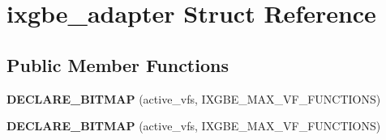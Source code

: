 \hypertarget{structixgbe__adapter}{
\section{ixgbe\_\-adapter Struct Reference}
\label{structixgbe__adapter}
}
\subsection*{Public Member Functions}
\begin{DoxyCompactItemize}
\item 
\hypertarget{structixgbe__adapter_aac0dfd863032737e6ca63d8edbc91b0a}{
{\bfseries DECLARE\_\-BITMAP} (active\_\-vfs, IXGBE\_\-MAX\_\-VF\_\-FUNCTIONS)}
\label{structixgbe__adapter_aac0dfd863032737e6ca63d8edbc91b0a}

\item 
\hypertarget{structixgbe__adapter_aac0dfd863032737e6ca63d8edbc91b0a}{
{\bfseries DECLARE\_\-BITMAP} (active\_\-vfs, IXGBE\_\-MAX\_\-VF\_\-FUNCTIONS)}
\label{structixgbe__adapter_aac0dfd863032737e6ca63d8edbc91b0a}

\end{DoxyCompactItemize}
